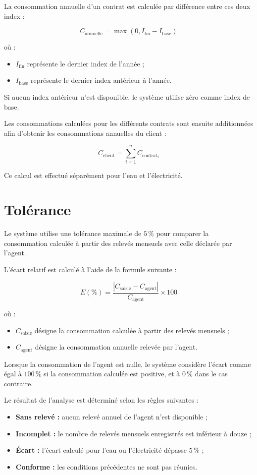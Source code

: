 La consommation annuelle d'un contrat est calculée par différence entre ces deux index :

\[
C_{\text{annuelle}} =
\max(0, I_{\text{fin}} - I_{\text{base}})
\]

où :
\begin{itemize}
    \item \(I_{\text{fin}}\) représente le dernier index de l'année ;
    \item \(I_{\text{base}}\) représente le dernier index antérieur à l'année.
\end{itemize}

Si aucun index antérieur n'est disponible, le système utilise zéro comme index de base.

Les consommations calculées pour les différents contrats sont ensuite additionnées afin d'obtenir les consommations annuelles du client :

\[
C_{\text{client}} =
\sum_{i=1}^{n} C_{\text{contrat}_i}
\]

Ce calcul est effectué séparément pour l'eau et l'électricité.

\section{Tolérance}

Le système utilise une tolérance maximale de \(5\,\%\) pour comparer la consommation calculée à partir des relevés mensuels avec celle déclarée par l'agent.

L'écart relatif est calculé à l'aide de la formule suivante :

\[
E(\%) =
\frac{|C_{\text{saisie}} - C_{\text{agent}}|}
{C_{\text{agent}}}
\times 100
\]

où :
\begin{itemize}
    \item \(C_{\text{saisie}}\) désigne la consommation calculée à partir des relevés mensuels ;
    \item \(C_{\text{agent}}\) désigne la consommation annuelle relevée par l'agent.
\end{itemize}

Lorsque la consommation de l'agent est nulle, le système considère l'écart comme égal à \(100\,\%\) si la consommation calculée est positive, et à \(0\,\%\) dans le cas contraire.

Le résultat de l'analyse est déterminé selon les règles suivantes :
\begin{itemize}
    \item \textbf{Sans relevé :} aucun relevé annuel de l'agent n'est disponible ;
    \item \textbf{Incomplet :} le nombre de relevés mensuels enregistrés est inférieur à douze ;
    \item \textbf{Écart :} l'écart calculé pour l'eau ou l'électricité dépasse \(5\,\%\) ;
    \item \textbf{Conforme :} les conditions précédentes ne sont pas réunies.
\end{itemize}

